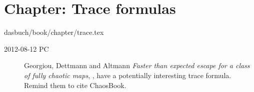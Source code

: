 %
%


\section{Chapter: Trace formulas}
\label{c-trace}\noindent dasbuch/book/chapter/trace.tex
\begin{description}
\item[2012-08-12 PC]
Georgiou, Dettmann and Altmann
\emph{Faster than expected escape for a class of fully chaotic maps}, ,
have a potentially interesting trace formula. Remind them to cite ChaosBook.

\end{description}

%
%
